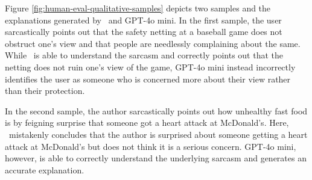 
Figure \ref{fig:human-eval-qualitative-samples} depicts two samples and the explanations generated by \model\ and GPT-4o mini. In the first sample, the user sarcastically points out that the safety netting at a baseball game does not obstruct one's view and that people are needlessly complaining about the same. While \model\ is able to understand the sarcasm and correctly points out that the netting does not ruin one's view of the game, GPT-4o mini instead incorrectly identifies the user as someone who is concerned more about their view rather than their protection.

In the second sample, the author sarcastically points out how unhealthy fast food is by feigning surprise that someone got a heart attack at McDonald's. Here, \model\ mistakenly concludes that the author is surprised about someone getting a heart attack at McDonald's but does not think it is a serious concern. GPT-4o mini, however, is able to correctly understand the underlying sarcasm and generates an accurate explanation.